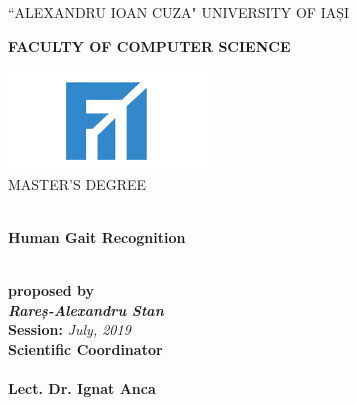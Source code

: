 \documentclass[12pt]{article}
\theoremstyle{definition}
\begin{document}
	\begin{titlepage}
		\begin{center}
			\vspace{1cm}
			``ALEXANDRU IOAN CUZA" UNIVERSITY OF IAȘI
			\
			\\
			\begin{large}
				\textbf{FACULTY OF COMPUTER SCIENCE}\\
			\end{large}		
			\vspace{2.5cm}
			\includegraphics{fii.png}
			\
			\\
			\vspace{1cm}
			MASTER'S DEGREE
			\begin{large}
				\
				\\
				\vspace{1.5cm}
				\textbf{Human Gait Recognition}
			\end{large}
			\\
			\vspace{1.5cm}
			\textbf{proposed by}
			\\
			\vspace{1.5cm}
			\textit{\textbf{Rareș-Alexandru Stan}}
			\\
			\vspace{2cm}
			\textbf{Session:} \textit{July, 2019}
			\\
			\vspace{1.5cm}
			\textbf{Scientific Coordinator}
			\
			\\
			\
			\\
			\textbf{Lect. Dr. Ignat Anca}
			
		\end{center}
	\end{titlepage}
	\newpage
	
\end{document}

